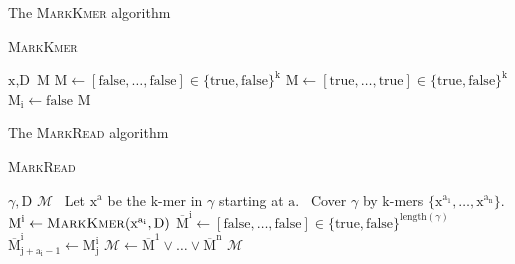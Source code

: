 \documentclass[12pt]{beamer}
\begin{document}
    \begin{frame}{The \textsc{MarkKmer} algorithm}
        \begin{algorithm}[H]
            \caption{\textsc{MarkKmer}}
            \begin{algorithmic}[1]
                \REQUIRE \(\text{x}, \text{D}\)
                \ENSURE \(\text{M}\)
                    \STATE \(\text{M} \leftarrow [\text{false},\dots,\text{false}]\in\{\text{true},\text{false}\}^\text{k}\)
                \ELSE
                    \STATE \(\text{M} \leftarrow [\text{true},\dots,\text{true}]\in\{\text{true},\text{false}\}^\text{k}\)
                                \STATE \(\text{M}_\text{i}\leftarrow\text{false}\)
                            \ENDIF
                        \ENDFOR
                    \ENDFOR
                \ENDIF
                \RETURN \(\text{M}\)
            \end{algorithmic}
        \end{algorithm}
    \end{frame}

    \begin{frame}{The \textsc{MarkRead} algorithm}
        \begin{algorithm}[H]
            \caption{\textsc{MarkRead}}
            \begin{algorithmic}[1]
                \REQUIRE \(\gamma, \text{D}\)
                \ENSURE \(\mathcal{M}\)
                \STATE \, \COMMENT Let \(\text{x}^\text{a}\) be the \(\text{k}\)-mer in \(\gamma\) starting at \(\text{a}\).
                \STATE \, \COMMENT Cover \(\gamma\) by \(\text{k}\)-mers \(\{\text{x}^{\text{a}_\text{1}},\dots,\text{x}^{\text{a}_\text{n}}\}\).
                    \STATE \(\text{M}^\text{i} \leftarrow \text{\textsc{MarkKmer}}(\text{x}^{\text{a}_\text{i}},\text{D})\)
                    \STATE \(\overline{\text{M}}^\text{i} \leftarrow [\text{false},\dots,\text{false}]\in \{\text{true},\text{false}\}^{\text{length}(\gamma)}\)
                        \STATE \(\overline{\text{M}}^{\text{i}}_{\text{j}+\text{a}_\text{i}-1} \leftarrow \text{M}^\text{i}_\text{j}\)
                    \ENDFOR
                \ENDFOR
                \STATE \(\mathcal{M} \leftarrow \overline{\text{M}}^1 \lor \dots \lor \overline{\text{M}}^\text{n}\)
                \RETURN \(\mathcal{M}\)
            \end{algorithmic}
        \end{algorithm}
    \end{frame}
\end{document}
